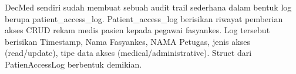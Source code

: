 DecMed sendiri sudah membuat sebuah audit trail sederhana dalam bentuk log berupa patient\_access\_log. Patient\_access\_log berisikan riwayat pemberian akses CRUD rekam medis pasien kepada pegawai fasyankes. Log tersebut berisikan Timestamp, Nama Fasyankes, NAMA Petugas, jenis akses (read/update), tipe data akses (medical/administrative). Struct dari PatienAccessLog berbentuk demikian.


